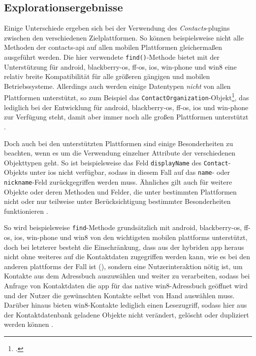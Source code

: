 	\pagebreak
	
\subsection{Explorationsergebnisse} \label{sec:contacts-ergebnis}
Einige Unterschiede ergeben sich bei der Verwendung des \emph{Contacts}-\glspl{plugin} zwischen den verschiedenen Zielplattformen.
So können beispielsweise nicht alle Methoden der \gls{contacts-api} auf allen mobilen Plattformen gleichermaßen ausgeführt werden.
Die hier verwendete \lstinline|find()|-Methode bietet mit der Unterstützung für \gls{android}, \gls{blackberry-os}, \gls{ff-os}, \gls{ios}, \gls{win-phone} und \gls{win8} eine relativ  breite Kompatibilität für alle größeren gängigen und mobilen Betriebssysteme.
Allerdings auch werden einige Datentypen \emph{nicht} von allen Plattformen unterstützt, so zum Beispiel das \lstinline|ContactOrganization|-Objekt\footnote{.}, das lediglich bei der Entwicklung für \gls{android}, \gls{blackberry-os}, \gls{ff-os}, \gls{ios} und \gls{win-phone} zur Verfügung steht, damit aber immer noch alle großen Plattformen unterstützt \cite{Cordova_Plugin_Registry_Contacts}.

Doch auch bei den unterstützten Plattformen sind einige Besonderheiten zu beachten, wenn es um die Verwendung einzelner Attribute der verschiedenen Objekttypen geht.
So ist beispielsweise das Feld \lstinline|displayName| des \lstinline|Contact|-Objekts unter \gls{ios} nicht verfügbar, sodass in diesem Fall auf das \lstinline|name|- oder \lstinline|nickname|-Feld zurückgegriffen werden muss.
Ähnliches gilt auch für weitere Objekte oder deren Methoden und Felder, die unter bestimmten Plattformen nicht oder nur teilweise unter Berücksichtigung bestimmter Besonderheiten funktionieren \cite{Cordova_Plugin_Registry_Contacts}.

So wird beispielsweise \lstinline|find|-Methode grundsätzlich mit \gls{android}, \gls{blackberry-os}, \gls{ff-os}, \gls{ios}, \gls{win-phone} und \gls{win8} von den wichtigsten mobilen \glspl{plattform} unterstützt, doch bei letzterer besteht die Einschränkung, dass aus der hybriden \gls{app} heraus nicht ohne weiteres auf die Kontaktdaten zugegriffen werden kann, wie es bei den anderen \glspl{plattform} der Fall ist (\so), sondern eine Nutzerinteraktion nötig ist, um Kontakte aus dem Adressbuch auszuwählen und weiter zu verarbeiten, sodass bei Anfrage von Kontaktdaten die \gls{app} für das native \gls{win8}-Adressbuch geöffnet wird und der Nutzer die gewünschten Kontakte selbst von Hand auswählen muss.
Darüber hinaus bieten \gls{win8}-Kontakte lediglich einen Lesezugriff, sodass hier aus der Kontaktdatenbank geladene Objekte nicht verändert, gelöscht oder dupliziert werden können \cite{Cordova_Plugin_Registry_Contacts}.

